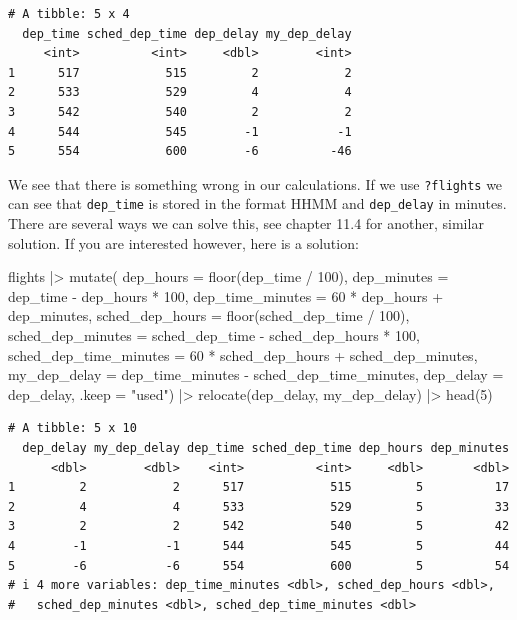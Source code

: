 \documentclass[
  letterpaper,
  DIV=11,
  numbers=noendperiod]{scrreprt}
\newenvironment{Shaded}{\begin{snugshade}}{\end{snugshade}}
\newcommand{\AttributeTok}[1]{\textcolor[rgb]{0.40,0.45,0.13}{#1}}
\newcommand{\DecValTok}[1]{\textcolor[rgb]{0.68,0.00,0.00}{#1}}
\newcommand{\FunctionTok}[1]{\textcolor[rgb]{0.28,0.35,0.67}{#1}}
\newcommand{\NormalTok}[1]{\textcolor[rgb]{0.00,0.23,0.31}{#1}}
\newcommand{\SpecialCharTok}[1]{\textcolor[rgb]{0.37,0.37,0.37}{#1}}
\newcommand{\StringTok}[1]{\textcolor[rgb]{0.13,0.47,0.30}{#1}}
\begin{document}
\begin{verbatim}
# A tibble: 5 x 4
  dep_time sched_dep_time dep_delay my_dep_delay
     <int>          <int>     <dbl>        <int>
1      517            515         2            2
2      533            529         4            4
3      542            540         2            2
4      544            545        -1           -1
5      554            600        -6          -46
\end{verbatim}

We see that there is something wrong in our calculations. If we use
\texttt{?flights} we can see that \texttt{dep\_time} is stored in the
format HHMM and \texttt{dep\_delay} in minutes. There are several ways
we can solve this, see chapter 11.4 for another, similar solution. If
you are interested however, here is a solution:

\begin{Shaded}
\begin{Highlighting}[]
\NormalTok{flights }\SpecialCharTok{|\textgreater{}}
  \FunctionTok{mutate}\NormalTok{(}
    \AttributeTok{dep\_hours =} \FunctionTok{floor}\NormalTok{(dep\_time }\SpecialCharTok{/} \DecValTok{100}\NormalTok{),}
    \AttributeTok{dep\_minutes =}\NormalTok{ dep\_time }\SpecialCharTok{{-}}\NormalTok{ dep\_hours }\SpecialCharTok{*} \DecValTok{100}\NormalTok{,}
    \AttributeTok{dep\_time\_minutes =} \DecValTok{60} \SpecialCharTok{*}\NormalTok{ dep\_hours }\SpecialCharTok{+}\NormalTok{ dep\_minutes,}
    \AttributeTok{sched\_dep\_hours =} \FunctionTok{floor}\NormalTok{(sched\_dep\_time }\SpecialCharTok{/} \DecValTok{100}\NormalTok{),}
    \AttributeTok{sched\_dep\_minutes =}\NormalTok{ sched\_dep\_time }\SpecialCharTok{{-}}\NormalTok{ sched\_dep\_hours }\SpecialCharTok{*} \DecValTok{100}\NormalTok{,}
    \AttributeTok{sched\_dep\_time\_minutes =} \DecValTok{60} \SpecialCharTok{*}\NormalTok{ sched\_dep\_hours }\SpecialCharTok{+}\NormalTok{ sched\_dep\_minutes,}
    \AttributeTok{my\_dep\_delay =}\NormalTok{ dep\_time\_minutes }\SpecialCharTok{{-}}\NormalTok{ sched\_dep\_time\_minutes,}
    \AttributeTok{dep\_delay =}\NormalTok{ dep\_delay,}
    \AttributeTok{.keep =} \StringTok{"used"}\NormalTok{) }\SpecialCharTok{|\textgreater{}}
  \FunctionTok{relocate}\NormalTok{(dep\_delay, my\_dep\_delay) }\SpecialCharTok{|\textgreater{}}
  \FunctionTok{head}\NormalTok{(}\DecValTok{5}\NormalTok{)}
\end{Highlighting}
\end{Shaded}

\begin{verbatim}
# A tibble: 5 x 10
  dep_delay my_dep_delay dep_time sched_dep_time dep_hours dep_minutes
      <dbl>        <dbl>    <int>          <int>     <dbl>       <dbl>
1         2            2      517            515         5          17
2         4            4      533            529         5          33
3         2            2      542            540         5          42
4        -1           -1      544            545         5          44
5        -6           -6      554            600         5          54
# i 4 more variables: dep_time_minutes <dbl>, sched_dep_hours <dbl>,
#   sched_dep_minutes <dbl>, sched_dep_time_minutes <dbl>
\end{verbatim}
\end{document}
